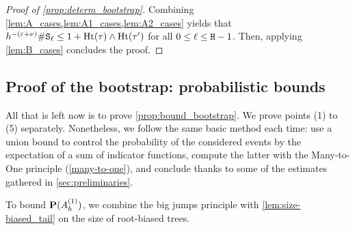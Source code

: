 \documentclass[11pt,reqno]{amsart}
\newcommand{\Ht}{\mathrm{Ht}}
\newcommand{\eps}{\varepsilon}
\begin{document}
\begin{proof}[Proof of \cref{prop:determ_bootstrap}]
Combining \cref{lem:A_cases,lem:A1_cases,lem:A2_cases} yields that $h^{-(\eps+\nu)}\# \ttS_\ell\leq 1+\Ht(\tau)\wedge\Ht(\tau')$ for all $0\leq \ell\leq \mathtt{H}-1$. Then, applying \cref{lem:B_cases} concludes the proof.
\end{proof}


\subsection{Proof of the bootstrap: probabilistic bounds}
\label{sec:bound_bootstrap}

All that is left now is to prove \cref{prop:bound_bootstrap}. We prove points (1) to (5) separately. Nonetheless, we follow the same basic method each time: use a union bound to control the probability of the considered events by the expectation of a sum of indicator functions, compute the latter with the Many-to-One principle (\cref{many-to-one}), and conclude thanks to some of the estimates gathered in \cref{sec:preliminaries}.

To bound $\mathbf{P}(A_h^{(1)})$, we combine the big jumps principle with \cref{lem:size-biased_tail} on the size of root-biased trees.
\end{document}

